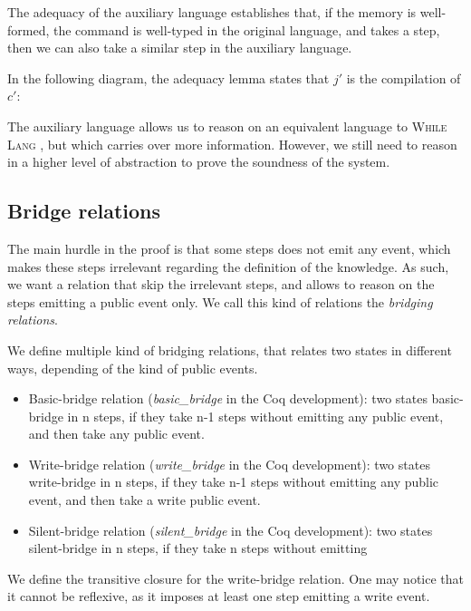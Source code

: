 \documentclass[10pt]{article}
\newcommand{\whilelang}{\textsc{While Lang} }
\newcommand{\compile}[1]{ #1 \downarrow }
\begin{document}
The adequacy of the auxiliary language establishes that, if the memory is well-formed, the
command is well-typed in the original language, and takes a step, then we can also take a similar
step in the auxiliary language.

In the following diagram, the adequacy lemma states that $j'$ is the compilation of $c'$:

The auxiliary language allows us to reason on an equivalent language to \whilelang, but which
carries over more information. However, we still need to reason in a higher level of abstraction to
prove the soundness of the system.

\subsection{Bridge relations}%
\label{subsec:brigde_rel}

The main hurdle in the proof is that some steps does not emit any event, which makes these steps
irrelevant regarding the definition of the knowledge. As such, we want a relation that skip the
irrelevant steps, and allows to reason on the steps emitting a public event only.
We call this kind of relations the \emph{bridging relations}.

We define multiple kind of bridging relations, that relates two states in different ways, depending
of the kind of public events.

\begin{itemize}
  \item Basic-bridge relation (\emph{basic\_bridge} in the Coq development):
        two states basic-bridge in n steps, if they take n-1 steps without emitting any public
        event, and then take any public event.
  \item Write-bridge relation (\emph{write\_bridge} in the Coq development):
        two states write-bridge in n steps, if they take n-1 steps without emitting any public
        event, and then take a write public event.
  \item Silent-bridge relation (\emph{silent\_bridge} in the Coq development):
        two states silent-bridge in n steps, if they take n steps without emitting
\end{itemize}

We define the transitive closure for the write-bridge relation. One may notice that it cannot be
reflexive, as it imposes at least one step emitting a write event.
\end{document}
